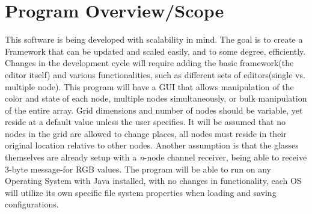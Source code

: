 \documentclass[12pt]{article}
\begin{document}
	\section{Program Overview/Scope}
  	This software is being developed with scalability in mind. The goal is to create a Framework that can be updated and scaled easily, and to some degree, efficiently. Changes in the development cycle will require adding the basic framework(the editor itself) and various functionalities, such as different sets of editors(single vs. multiple node). This program will have a GUI that allows manipulation of the color and state of each node, multiple nodes simultaneously, or bulk manipulation of the entire array. Grid dimensions and number of nodes should be variable, yet reside at a default value unless the user specifies. It will be assumed that no nodes in the grid are allowed to change places, all nodes must reside in their original location relative to other nodes. Another assumption is that the glasses themselves are already setup with a \textit{n}-node channel receiver, being able to receive $3$-byte message-for RGB values. The program will be able to run on any Operating System with Java installed, with no changes in functionality, each OS will utilize its own specific file system properties when loading and saving configurations.
	
\end{document}
